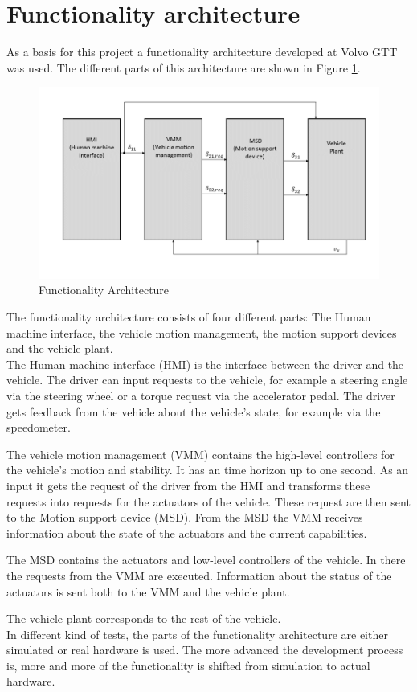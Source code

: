 \documentclass[ExampleMasters.tex]{subfiles}
\begin{document}
\section{Functionality architecture}
\label{sec:func_architecture}

As a basis for this project a functionality architecture developed at Volvo GTT was used. The different parts of this architecture are shown in Figure \ref{fig:funct_architecture}.

\begin{figure}[h]
	\centering
	\includegraphics[width=1\linewidth]{figures/functionality_architecture}
	
	\caption{Functionality Architecture}
	\label{fig:funct_architecture}
\end{figure}

The functionality architecture consists of four different parts: The Human machine interface, the vehicle motion management, the motion support devices and the vehicle plant.\\
The Human machine interface (HMI) is the interface between the driver and the vehicle. The driver can input requests to the vehicle, for example a steering angle via the steering wheel or a torque request via the accelerator pedal. The driver gets feedback from the vehicle about the vehicle's state, for example via the speedometer.

The vehicle motion management (VMM) contains the high-level controllers for the vehicle's motion and stability. It has an time horizon up to one second. As an input it gets the request of the driver from the HMI and transforms these requests into requests for the actuators of the vehicle. These request are then sent to the Motion support device (MSD). From the MSD the VMM receives information about the state of the actuators and the current capabilities.

The MSD contains the actuators and low-level controllers of the vehicle. In there the requests from the VMM are executed. Information about the status of the actuators is sent both to the VMM and the vehicle plant.

The vehicle plant corresponds to the rest of the vehicle.
\\
In different kind of tests, the parts of the functionality architecture are either simulated or real hardware is used. The more advanced the development process is, more and more of the functionality is shifted from simulation to actual hardware.
\end{document}
